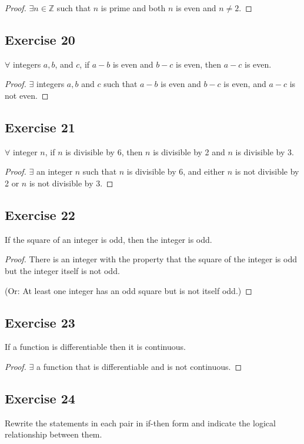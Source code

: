 \documentclass[14pt]{extarticle}
\newcommand{\Z}{\mathbb{Z}}
\newcommand{\fa}{\forall}
\newcommand{\te}{\exists}
\begin{document}
\begin{proof}
$\te n \in \Z$ such that $n$ is prime and both $n$ is even and $n \neq 2$.
\end{proof}

\subsection{Exercise 20}
$\fa$ integers $a, b$, and $c$, if $a - b$ is even and $b - c$ is even, then $a - c$ is even.

\begin{proof}
$\te$ integers $a, b$ and $c$ such that $a - b$ is even and $b - c$ is even, and $a - c$ is not even.
\end{proof}

\subsection{Exercise 21}
$\fa$ integer $n$, if $n$ is divisible by 6, then $n$ is divisible by 2 and $n$ is divisible by 3.

\begin{proof}
$\te$ an integer $n$ such that $n$ is divisible by 6, and either $n$ is not divisible by 2 or $n$ is not divisible by 3.
\end{proof}

\subsection{Exercise 22}
If the square of an integer is odd, then the integer is odd.

\begin{proof}
There is an integer with the property that the square of the integer is odd but the integer itself is not odd. 

(Or: At least one integer has an odd square but is not itself odd.)
\end{proof}

\subsection{Exercise 23}
If a function is differentiable then it is continuous.

\begin{proof}
$\te$ a function that is differentiable and is not continuous.
\end{proof}

\subsection{Exercise 24}
Rewrite the statements in each pair in if-then form and indicate the logical relationship between them.
\end{document}
